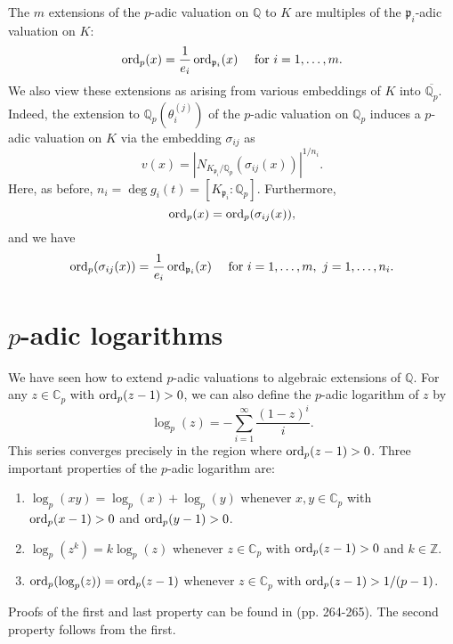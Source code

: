 The $m$ extensions of the $p$-adic valuation on $\mathbb{Q}$ to $K$ are multiples of the $\mathfrak{p}_i$-adic valuation on $K$:
\[\operatorname{ord}_p(x) = \frac{1}{e_i}\operatorname{ord}_{\mathfrak{p}_i}(x) \quad \text{ for } i = 1, \dots, m.\]
We also view these extensions as arising from various embeddings of $K$ into $\overline{\mathbb{Q}_p}$. Indeed, the extension to $\mathbb{Q}_p(\theta_i^{(j)})$ of the $p$-adic valuation on $\mathbb{Q}_p$ induces a $p$-adic valuation on $K$ via the embedding $\sigma_{ij}$ as 
\[v(x) = |N_{K_{\mathfrak{p}_i}/\mathbb{Q}_p}(\sigma_{ij}(x))|^{1/n_i}.\]
Here, as before, $n_i = \deg g_i(t) = [K_{\mathfrak{p}_i} : \mathbb{Q}_p]$. Furthermore, 
\[\operatorname{ord}_p(x) = \operatorname{ord}_p(\sigma_{ij}(x)),\]
and we have
\[\operatorname{ord}_p(\sigma_{ij}(x)) =  \frac{1}{e_i}\operatorname{ord}_{\mathfrak{p}_i}(x) \quad \text{ for } i = 1, \dots, m,\ j = 1, \dots, n_i.\]




\section{$p$-adic logarithms}
\label{sec:pAdicLogarithms}

We have seen how to extend $p$-adic valuations to algebraic extensions of $\mathbb{Q}$. For any $z \in \mathbb{C}_p$ with $\operatorname{ord}_p(z-1) > 0$, we can also define the $p$-adic logarithm of $z$ by
\[\log_p(z) = -\sum_{i=1}^{\infty} \frac{(1-z)^i}{i}.\]
This series converges precisely in the region where $\operatorname{ord}_p(z-1) > 0$. Three important properties of the $p$-adic logarithm are:
\begin{enumerate}
\item $\log_p(xy) = \log_p(x) + \log_p(y)$ whenever $x,y \in \mathbb{C}_p$ with $\operatorname{ord}_p(x-1) > 0$ and ${\operatorname{ord}_p(y-1) > 0}$.
\item $\log_p(z^k) = k \log_p(z)$ whenever $z \in \mathbb{C}_p$ with $\operatorname{ord}_p(z-1) > 0$ and $k \in \mathbb{Z}$.
\item $\operatorname{ord}_p(\log_p(z)) = \operatorname{ord}_p(z-1)$ whenever $z \in \mathbb{C}_p$ with $\operatorname{ord}_p(z-1) > 1/(p-1)$.
\end{enumerate}
Proofs of the first and last property can be found in \cite{Has2} (pp. 264-265). The second property follows from the first.

